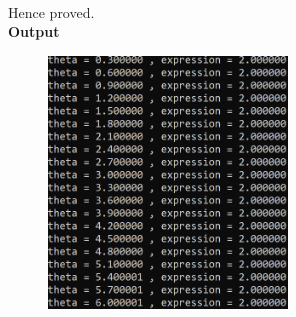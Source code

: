 \documentclass[a4paper,12pts]{article}
\begin{document}
\\[.03in]
Hence proved.\\[.1in]
\textbf{\Large{Output}}
\begin{figure}[H]
\begin{center}
\includegraphics[width=2.5in]{fig.png}
\end{center}
\end{figure}
\end{document}
